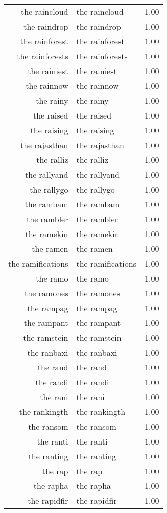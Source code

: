 \begin{table}[ht]
\begin{tabular}{rlr}
  the raincloud & the raincloud & 1.00 \\ 
  the raindrop & the raindrop & 1.00 \\ 
  the rainforest & the rainforest & 1.00 \\ 
  the rainforests & the rainforests & 1.00 \\ 
  the rainiest & the rainiest & 1.00 \\ 
  the rainnow & the rainnow & 1.00 \\ 
  the rainy & the rainy & 1.00 \\ 
  the raised & the raised & 1.00 \\ 
  the raising & the raising & 1.00 \\ 
  the rajasthan & the rajasthan & 1.00 \\ 
  the ralliz & the ralliz & 1.00 \\ 
  the rallyand & the rallyand & 1.00 \\ 
  the rallygo & the rallygo & 1.00 \\ 
  the rambam & the rambam & 1.00 \\ 
  the rambler & the rambler & 1.00 \\ 
  the ramekin & the ramekin & 1.00 \\ 
  the ramen & the ramen & 1.00 \\ 
  the ramifications & the ramifications & 1.00 \\ 
  the ramo & the ramo & 1.00 \\ 
  the ramones & the ramones & 1.00 \\ 
  the rampag & the rampag & 1.00 \\ 
  the rampant & the rampant & 1.00 \\ 
  the ramstein & the ramstein & 1.00 \\ 
  the ranbaxi & the ranbaxi & 1.00 \\ 
  the rand & the rand & 1.00 \\ 
  the randi & the randi & 1.00 \\ 
  the rani & the rani & 1.00 \\ 
  the rankingth & the rankingth & 1.00 \\ 
  the ransom & the ransom & 1.00 \\ 
  the ranti & the ranti & 1.00 \\ 
  the ranting & the ranting & 1.00 \\ 
  the rap & the rap & 1.00 \\ 
  the rapha & the rapha & 1.00 \\ 
  the rapidfir & the rapidfir & 1.00 \\ 

\end{tabular}
\end{table}
